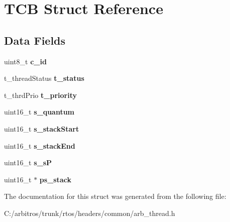 \hypertarget{struct_t_c_b}{\section{T\-C\-B Struct Reference}
\label{struct_t_c_b}
}
\subsection*{Data Fields}
\begin{DoxyCompactItemize}
\item 
\hypertarget{struct_t_c_b_accd003a0d98478887c63ba79d4e9aa09}{uint8\-\_\-t {\bfseries c\-\_\-id}}\label{struct_t_c_b_accd003a0d98478887c63ba79d4e9aa09}

\item 
\hypertarget{struct_t_c_b_aac3451a6a29c968c9edeb1d176a07b0d}{t\-\_\-thread\-Status {\bfseries t\-\_\-status}}\label{struct_t_c_b_aac3451a6a29c968c9edeb1d176a07b0d}

\item 
\hypertarget{struct_t_c_b_ad77a6170bafcd098c0056fb745232346}{t\-\_\-thrd\-Prio {\bfseries t\-\_\-priority}}\label{struct_t_c_b_ad77a6170bafcd098c0056fb745232346}

\item 
\hypertarget{struct_t_c_b_a8210bc6cc57c677e9e88cf34d1f69a0e}{uint16\-\_\-t {\bfseries s\-\_\-quantum}}\label{struct_t_c_b_a8210bc6cc57c677e9e88cf34d1f69a0e}

\item 
\hypertarget{struct_t_c_b_a5b907955d5f9d7f4d4cae458dca76690}{uint16\-\_\-t {\bfseries s\-\_\-stack\-Start}}\label{struct_t_c_b_a5b907955d5f9d7f4d4cae458dca76690}

\item 
\hypertarget{struct_t_c_b_a07f357c62c954700f1bc874590e34b70}{uint16\-\_\-t {\bfseries s\-\_\-stack\-End}}\label{struct_t_c_b_a07f357c62c954700f1bc874590e34b70}

\item 
\hypertarget{struct_t_c_b_ab0576dc58a0d7bfa134d83b5ffd88b25}{uint16\-\_\-t {\bfseries s\-\_\-s\-P}}\label{struct_t_c_b_ab0576dc58a0d7bfa134d83b5ffd88b25}

\item 
\hypertarget{struct_t_c_b_a6e97388638258d11d93b7bd8a00c3e80}{uint16\-\_\-t $\ast$ {\bfseries ps\-\_\-stack}}\label{struct_t_c_b_a6e97388638258d11d93b7bd8a00c3e80}

\end{DoxyCompactItemize}


The documentation for this struct was generated from the following file\-:\begin{DoxyCompactItemize}
\item 
C\-:/arbitros/trunk/rtos/headers/common/arb\-\_\-thread.\-h\end{DoxyCompactItemize}
